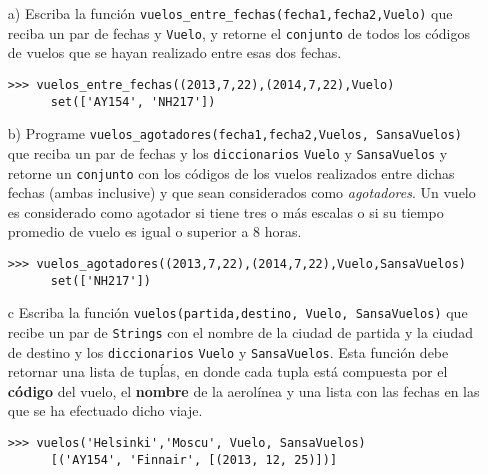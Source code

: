   \begin{itemize}
  \item[a)]
    Escriba la función 
    \texttt{vuelos\_entre\_fechas(fecha1,fecha2,Vuelo)}
    que reciba un par de fechas y \texttt{Vuelo},
    y retorne el \texttt{conjunto} de todos los
    códigos de vuelos que se hayan realizado entre esas
    dos fechas.

    \begin{lstlisting}[style=consola]
      >>> vuelos_entre_fechas((2013,7,22),(2014,7,22),Vuelo)
      set(['AY154', 'NH217'])
    \end{lstlisting}
  \item[b)]
    Programe 
    \texttt{vuelos\_agotadores(fecha1,fecha2,Vuelos, SansaVuelos)}
    que reciba un par de fechas y los \texttt{diccionarios}
    \texttt{Vuelo} y \texttt{SansaVuelos}
    y retorne un \texttt{conjunto}
    con los códigos de los vuelos realizados entre dichas fechas
    (ambas inclusive) y que sean considerados como \emph{agotadores}.
    Un vuelo es considerado como agotador si tiene tres o más escalas
    o si su tiempo promedio de vuelo es igual o superior a 8 horas.

    \begin{lstlisting}[style=consola]
      >>> vuelos_agotadores((2013,7,22),(2014,7,22),Vuelo,SansaVuelos)
      set(['NH217'])
    \end{lstlisting}
  \item[c]
    Escriba la función
    \texttt{vuelos(partida,destino, Vuelo, SansaVuelos)}
    que recibe un par de \texttt{Strings}
    con el nombre de la ciudad de partida
    y la ciudad de destino y los
    \texttt{diccionarios}
    \texttt{Vuelo} y \texttt{SansaVuelos}.
    Esta función debe retornar una lista de tupĺas,
    en donde cada tupla está compuesta por el \textbf{código}
    del vuelo,
    el \textbf{nombre} de la aerolínea
    y una lista con las fechas en las que se ha
    efectuado dicho viaje.
    
    \begin{lstlisting}[style=consola]
      >>> vuelos('Helsinki','Moscu', Vuelo, SansaVuelos)
      [('AY154', 'Finnair', [(2013, 12, 25)])]
    \end{lstlisting}
  \end{itemize}